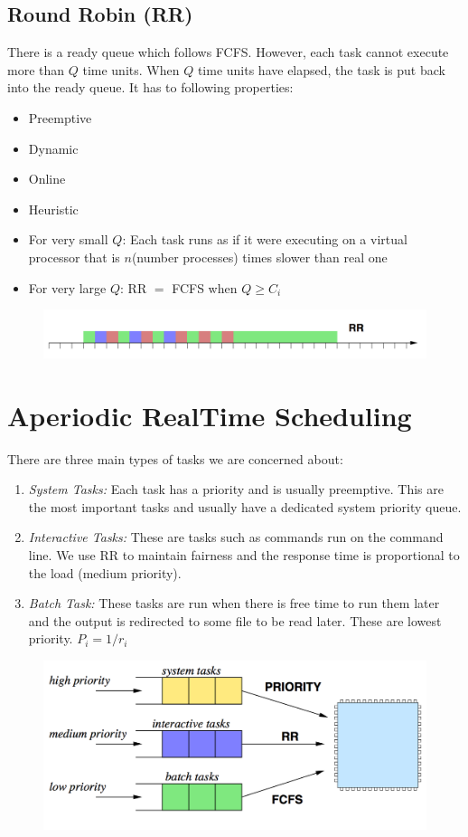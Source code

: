 \documentclass{hw}
\begin{document}
\subsection{Round Robin (RR)}
There is a ready queue which follows FCFS. However, each task cannot execute more
than $Q$ time units. When $Q$ time units have elapsed, the task is put back into 
the ready queue. It has to following properties:
\begin{itemize}
  \item Preemptive
  \item Dynamic
  \item Online
  \item Heuristic
  \item For very small $Q$: Each task runs as if it were executing on a virtual 
    processor that is $n$(number processes) times slower than real one
  \item For very large $Q$: RR $=$ FCFS when $Q \geq C_{i}$
\end{itemize}

\begin{figure}[H]
  \centering
  \includegraphics[scale=.6]{img/rr}
\end{figure}


\section{Aperiodic Real\-Time Scheduling}
There are three main types of tasks we are concerned about:
\begin{enumerate}
  \item \emph{System Tasks:} Each task has a priority and is usually preemptive.
    This are the most important tasks and usually have a dedicated system 
    priority queue.
  \item \emph{Interactive Tasks:} These are tasks such as commands run on the 
    command line. We use RR to maintain fairness and the response time is 
    proportional to the load (medium priority).
  \item \emph{Batch Task:} These tasks are run when there is free time to run 
    them later and the output is redirected to some file to be read later. These
    are lowest priority. $P_{i} = 1/r_{i}$
\end{enumerate}
\begin{figure}[H]
  \centering
  \includegraphics[scale=.6]{img/tasks}
\end{figure}
\end{document}
